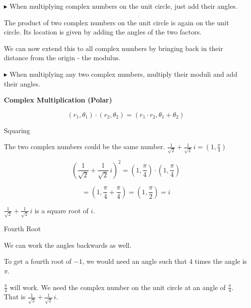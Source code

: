 \documentclass{ximera}
\begin{document}
 

\textcolor{red!80!black}{$\blacktriangleright$} When multiplying complex numbers on the unit circle, just add their angles. 




The product of two complex numbers on the unit circle is again on the unit circle. Its location is given by adding the angles of the two factors.


We can now extend this to all complex numbers by bringing back in their distance from the origin - the modulus. 




\textcolor{red!80!black}{$\blacktriangleright$} When multiplying any two complex numbers, multiply their moduli and add their angles.



\begin{theorem}  \textbf{\textcolor{green!50!black}{Complex Multiplication (Polar)}}

\[  (r_1, \theta_1) \cdot (r_2, \theta_2) = (r_1 \cdot r_2, \theta_1 + \theta_2)              \]


\end{theorem}




\begin{example}  Squaring 


The two complex numbers could be the same number. $\frac{1}{\sqrt{2}} + \frac{1}{\sqrt{2}} \, i = \left(1, \frac{\pi}{4} \right)$


\[
\left( \frac{1}{\sqrt{2}} + \frac{1}{\sqrt{2}} \, i \right)^2 = \left(1, \frac{\pi}{4} \right) \cdot \left(1, \frac{\pi}{4} \right)
\]

\[
= \left(1, \frac{\pi}{4} + \frac{\pi}{4} \right) = \left( 1, \frac{\pi}{2} \right) = i
\]




$\frac{1}{\sqrt{2}} + \frac{1}{\sqrt{2}} \, i$ is a square root of $i$.


\end{example}







\begin{example}  Fourth Root 


We can work the angles backwards as well.  

To get a fourth root of $-1$, we would need an angle such that $4$ times the angle is $\pi$.    

$\frac{\pi}{4}$ will work.  We need the complex number on the unit circle at an angle of $\frac{\pi}{4}$.  That is $\frac{1}{\sqrt{2}} + \frac{1}{\sqrt{2}} \, i$.


\end{example}
\end{document}
